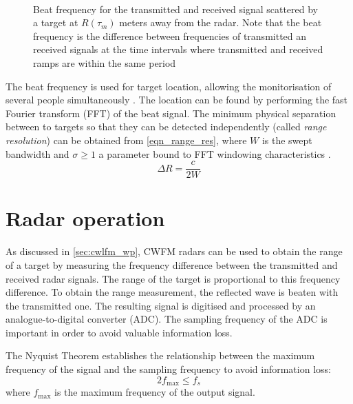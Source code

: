 \begin{figure}[ht]
	\centering
	\\
	\caption[Beat frequency for the transmitted and received signal scattered by a target at $R(\tau_m)$ meters away from the radar]{Beat frequency for the transmitted and received signal scattered by a target at $R(\tau_m)$ meters away from the radar. Note that the beat frequency is the difference between frequencies of transmitted an received signals at the time intervals where transmitted and received ramps are within the same period \cite{Sardinero2022} 		\label{fig_cwlfm_ramps}}
\end{figure}

The beat frequency is used for target location, allowing the monitorisation of several people simultaneously \cite{Antolinos2020}. The location can be found by performing the fast Fourier transform (FFT) of the beat signal. The minimum physical separation between to targets so that they can be detected independently (called \textit{range resolution}) can be obtained from \cref{eqn_range_res}, where $W$ is the swept bandwidth and $\sigma \ge 1$ a parameter bound to FFT windowing characteristics \cite{Sardinero2022}.
\begin{equation} \label{eqn_range_res}
	\Delta R = \frac{c}{2W} %
\end{equation}

\section{Radar operation} \label{sec:radar_op}

As discussed in \cref{sec:cwlfm_wp}, CWFM radars can be used to obtain the range of a target by measuring the frequency difference between the transmitted and received radar signals. The range of the target is proportional to this frequency difference. To obtain the range measurement, the reflected wave is beaten with the transmitted one. The resulting signal is digitised and processed by an analogue-to-digital converter (ADC). The sampling frequency of the ADC is important in order to avoid valuable information loss.

The Nyquist Theorem \cite{Shannon1949} establishes the relationship between the maximum frequency of the signal and the sampling frequency to avoid information loss:
\begin{equation} \label{eq:nyquist}
	2 f_{\max} \le f_s
\end{equation}
where $f_{\max}$ is the maximum frequency of the output signal.

